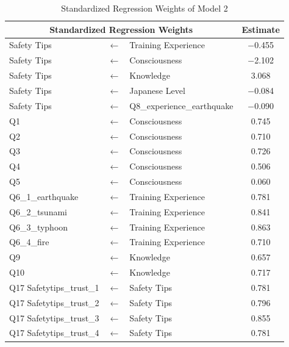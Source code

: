 \begin{table}[h]
  \caption{Standardized Regression Weights of Model 2 }
  \label{table12}
  \centering
  \begin{tabular}{|l|c|l|c|}
 \hline
 \multicolumn{3}{|c|}{Standardized Regression Weights} & Estimate \\
 \hline
  Safety Tips & $\longleftarrow$ & Training Experience & $-$0.455 \\
  Safety Tips & $\longleftarrow$ & Consciousness & $-$2.102 \\
  Safety Tips & $\longleftarrow$ & Knowledge & 3.068 \\
  Safety Tips & $\longleftarrow$ & Japanese Level & $-$0.084\\
  Safety Tips & $\longleftarrow$ & Q8\_experience\_earthquake & $-$0.090 \\
  Q1              & $\longleftarrow$ & Consciousness & 0.745 \\
  Q2              & $\longleftarrow$ & Consciousness & 0.710 \\
  Q3              & $\longleftarrow$ & Consciousness & 0.726 \\
  Q4              & $\longleftarrow$ & Consciousness & 0.506 \\
  Q5              & $\longleftarrow$ & Consciousness & 0.060 \\
  Q6\_1\_earthquake & $\longleftarrow$ & Training Experience & 0.781 \\
  Q6\_2\_tsunami & $\longleftarrow$ & Training Experience & 0.841 \\
  Q6\_3\_typhoon & $\longleftarrow$ & Training Experience & 0.863 \\
  Q6\_4\_fire & $\longleftarrow$ & Training Experience & 0.710 \\
  Q9             & $\longleftarrow$ & Knowledge & 0.657 \\
  Q10           & $\longleftarrow$ & Knowledge & 0.717 \\
  Q17 Safetytips\_trust\_1 & $\longleftarrow$ & Safety Tips & 0.781 \\
  Q17 Safetytips\_trust\_2 & $\longleftarrow$ & Safety Tips & 0.796 \\
  Q17 Safetytips\_trust\_3 & $\longleftarrow$ & Safety Tips & 0.855 \\
  Q17 Safetytips\_trust\_4 & $\longleftarrow$ & Safety Tips & 0.781 \\
 \hline
  \end{tabular}
\end{table}

